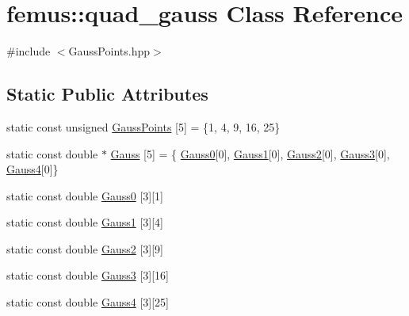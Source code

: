 \hypertarget{classfemus_1_1quad__gauss}{}\section{femus\+:\+:quad\+\_\+gauss Class Reference}
\label{classfemus_1_1quad__gauss}


{\ttfamily \#include $<$Gauss\+Points.\+hpp$>$}

\subsection*{Static Public Attributes}
\begin{DoxyCompactItemize}
\item 
static const unsigned \mbox{\hyperlink{classfemus_1_1quad__gauss_a8341b078548ce5e69a6f13e0878f9f06}{Gauss\+Points}} \mbox{[}5\mbox{]} = \{1, 4, 9, 16, 25\}
\item 
static const double $\ast$ \mbox{\hyperlink{classfemus_1_1quad__gauss_a4035ceccc61c1acec68131dc68adb1c1}{Gauss}} \mbox{[}5\mbox{]} = \{ \mbox{\hyperlink{classfemus_1_1quad__gauss_aa348ceb37f8a61fabf45a387b449caa6}{Gauss0}}\mbox{[}0\mbox{]}, \mbox{\hyperlink{classfemus_1_1quad__gauss_a9e53cfc36f1b6a3fd3f0d232a3d10cd2}{Gauss1}}\mbox{[}0\mbox{]}, \mbox{\hyperlink{classfemus_1_1quad__gauss_af8054c34e7f8111ea4e3859ad1dd37be}{Gauss2}}\mbox{[}0\mbox{]}, \mbox{\hyperlink{classfemus_1_1quad__gauss_aff0fd84125a9e72c322ec52307acb56f}{Gauss3}}\mbox{[}0\mbox{]}, \mbox{\hyperlink{classfemus_1_1quad__gauss_a999c35e1333bb5f0c307fe4f5fc13633}{Gauss4}}\mbox{[}0\mbox{]}\}
\item 
static const double \mbox{\hyperlink{classfemus_1_1quad__gauss_aa348ceb37f8a61fabf45a387b449caa6}{Gauss0}} \mbox{[}3\mbox{]}\mbox{[}1\mbox{]}
\item 
static const double \mbox{\hyperlink{classfemus_1_1quad__gauss_a9e53cfc36f1b6a3fd3f0d232a3d10cd2}{Gauss1}} \mbox{[}3\mbox{]}\mbox{[}4\mbox{]}
\item 
static const double \mbox{\hyperlink{classfemus_1_1quad__gauss_af8054c34e7f8111ea4e3859ad1dd37be}{Gauss2}} \mbox{[}3\mbox{]}\mbox{[}9\mbox{]}
\item 
static const double \mbox{\hyperlink{classfemus_1_1quad__gauss_aff0fd84125a9e72c322ec52307acb56f}{Gauss3}} \mbox{[}3\mbox{]}\mbox{[}16\mbox{]}
\item 
static const double \mbox{\hyperlink{classfemus_1_1quad__gauss_a999c35e1333bb5f0c307fe4f5fc13633}{Gauss4}} \mbox{[}3\mbox{]}\mbox{[}25\mbox{]}
\end{DoxyCompactItemize}


